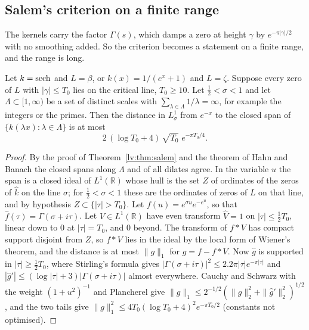 \subsection{Salem's criterion on a finite range}

The kernels carry the factor $\Gamma(s)$, which damps a zero at height $\gamma$ by $e^{-\pi|\gamma|/2}$ with no smoothing added. So the criterion becomes a statement on a finite range, and the range is long.

\begin{theorem}\label{gbm:thm:salemfinite}
Let $k=\operatorname{sech}$ and $L=\beta$, or $k(x)=1/(e^x+1)$ and $L=\zeta$. Suppose every zero of $L$ with $|\gamma|\le T_0$ lies on the critical line, $T_0\ge10$. Let $\frac12<\sigma<1$ and let $\Lambda\subset[1,\infty)$ be a set of distinct scales with $\sum_{\lambda\in\Lambda}1/\lambda=\infty$, for example the integers or the primes. Then the distance in $L^1_\sigma$ from $e^{-x}$ to the closed span of $\{k(\lambda x):\lambda\in\Lambda\}$ is at most
\[
2\,(\log T_0+4)\,\sqrt{T_0}\;e^{-\pi T_0/4}.
\]
\end{theorem}

\begin{proof}
By the proof of Theorem~\ref{lv:thm:salem} and the theorem of Hahn and Banach the closed spans along $\Lambda$ and of all dilates agree. In the variable $u$ the span is a closed ideal of $L^1(\mathbb R)$ whose hull is the set $Z$ of ordinates of the zeros of $\hat k$ on the line $\sigma$; for $\frac12<\sigma<1$ these are the ordinates of zeros of $L$ on that line, and by hypothesis $Z\subset\{|\tau|>T_0\}$. Let $f(u)=e^{\sigma u}e^{-e^u}$, so that $\hat f(\tau)=\Gamma(\sigma+i\tau)$. Let $V\in L^1(\mathbb R)$ have even transform $\hat V=1$ on $|\tau|\le\frac12T_0$, linear down to $0$ at $|\tau|=T_0$, and $0$ beyond. The transform of $f*V$ has compact support disjoint from $Z$, so $f*V$ lies in the ideal by the local form of Wiener's theorem, and the distance is at most $\|g\|_1$ for $g=f-f*V$. Now $\hat g$ is supported in $|\tau|\ge\frac12T_0$, where Stirling's formula gives $|\Gamma(\sigma+i\tau)|^2\le2.2\pi|\tau|e^{-\pi|\tau|}$ and $|\hat g'|\le(\log|\tau|+3)|\Gamma(\sigma+i\tau)|$ almost everywhere. Cauchy and Schwarz with the weight $(1+u^2)^{-1}$ and Plancherel give $\|g\|_1\le2^{-1/2}(\|\hat g\|_2^2+\|\hat g'\|_2^2)^{1/2}$, and the two tails give $\|g\|_1^2\le4T_0(\log T_0+4)^2e^{-\pi T_0/2}$ (constants not optimised).
\end{proof}

